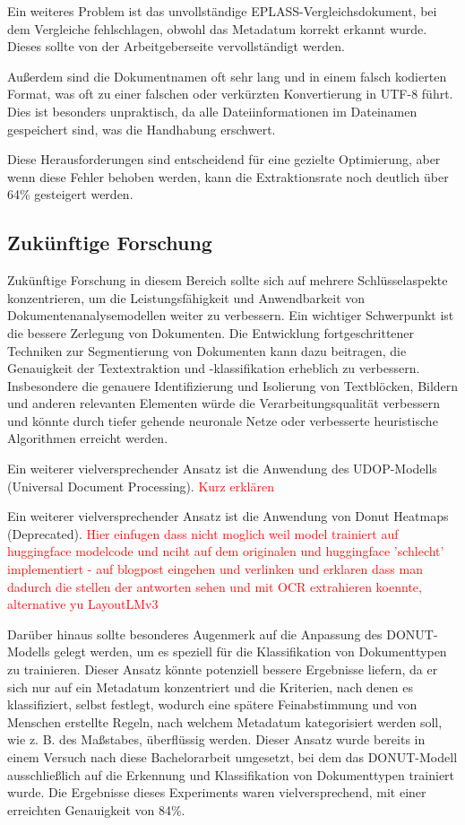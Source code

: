 \documentclass[12pt,a4paper,twoside]{article}
\newcommand\myworries[1]{\textcolor{red}{#1}}
\begin{document}
Ein weiteres Problem ist das unvollständige EPLASS-Vergleichsdokument, bei dem Vergleiche fehlschlagen, obwohl das Metadatum korrekt erkannt wurde. Dieses sollte von der Arbeitgeberseite vervollständigt werden.

Außerdem sind die Dokumentnamen oft sehr lang und in einem falsch kodierten Format, was oft zu einer falschen oder verkürzten Konvertierung in UTF-8 führt. Dies ist besonders unpraktisch, da alle Dateiinformationen im Dateinamen gespeichert sind, was die Handhabung erschwert.

Diese Herausforderungen sind entscheidend für eine gezielte Optimierung, aber wenn diese Fehler behoben werden, kann die Extraktionsrate noch deutlich über 64\% gesteigert werden.

\subsection{Zukünftige Forschung}
Zukünftige Forschung in diesem Bereich sollte sich auf mehrere Schlüsselaspekte konzentrieren, um die Leistungsfähigkeit und Anwendbarkeit von Dokumentenanalysemodellen weiter zu verbessern. Ein wichtiger Schwerpunkt ist die bessere Zerlegung von Dokumenten. Die Entwicklung fortgeschrittener Techniken zur Segmentierung von Dokumenten kann dazu beitragen, die Genauigkeit der Textextraktion und -klassifikation erheblich zu verbessern. Insbesondere die genauere Identifizierung und Isolierung von Textblöcken, Bildern und anderen relevanten Elementen würde die Verarbeitungsqualität verbessern und könnte durch tiefer gehende neuronale Netze oder verbesserte heuristische Algorithmen erreicht werden.

Ein weiterer vielversprechender Ansatz ist die Anwendung des UDOP-Modells (Universal Document Processing).
\myworries{Kurz erklären}

Ein weiterer vielversprechender Ansatz ist die Anwendung von Donut Heatmaps (Deprecated).
\myworries{Hier einfugen dass nicht moglich weil model trainiert auf huggingface modelcode und nciht auf dem originalen und huggingface 'schlecht' implementiert - auf blogpost eingehen und verlinken und erklaren dass man dadurch die stellen der antworten sehen und mit OCR extrahieren koennte, alternative yu LayoutLMv3}

Darüber hinaus sollte besonderes Augenmerk auf die Anpassung des DONUT-Modells gelegt werden, um es speziell für die Klassifikation von Dokumenttypen zu trainieren. Dieser Ansatz könnte potenziell bessere Ergebnisse liefern, da er sich nur auf ein Metadatum konzentriert und die Kriterien, nach denen es klassifiziert, selbst festlegt, wodurch eine spätere Feinabstimmung und von Menschen erstellte Regeln, nach welchem Metadatum kategorisiert werden soll, wie z. B. des Maßstabes, überflüssig werden.
Dieser Ansatz wurde bereits in einem Versuch nach diese Bachelorarbeit umgesetzt, bei dem das DONUT-Modell ausschließlich auf die Erkennung und Klassifikation von Dokumenttypen trainiert wurde. Die Ergebnisse dieses Experiments waren vielversprechend, mit einer erreichten Genauigkeit von 84\%.
\end{document}
